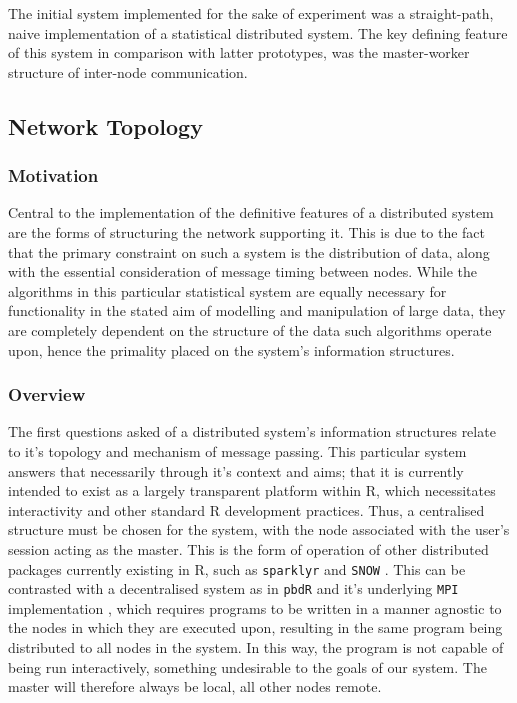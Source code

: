 The initial system implemented for the sake of experiment was a straight-path, naive implementation of a statistical distributed system.
The key defining feature of this system in comparison with latter prototypes, was the master-worker structure of inter-node communication.

\subsection{Network Topology}\label{sec:mw-topo}

\hypertarget{motivation}{%
\subsubsection{Motivation}\label{motivation}}

Central to the implementation of the definitive features of a
distributed system are the forms of structuring the network supporting it.
This is due to the fact that the primary constraint on such a system is
the distribution of data, along with the essential consideration of
message timing between nodes. While the algorithms in this particular
statistical system are equally necessary for functionality in the stated
aim of modelling and manipulation of large data, they are completely
dependent on the structure of the data such algorithms operate upon,
hence the primality placed on the system's information structures.

\hypertarget{overview}{%
\subsubsection{Overview}\label{overview}}

The first questions asked of a distributed system's information
structures relate to it's topology and mechanism of message passing.
This particular system answers that necessarily through it's context and
aims; that it is currently intended to exist as a largely transparent
platform within R, which necessitates interactivity and other standard R
development practices. Thus, a centralised structure must be chosen for
the system, with the node associated with the user's \R session acting as
the master. This is the form of operation of other distributed packages
currently existing in R, such as \texttt{sparklyr} and \texttt{SNOW}
\cite{luraschi20}\cite{tierney18}. This can be contrasted with a
decentralised system as in \texttt{pbdR} and it's underlying
\texttt{MPI} implementation \cite{pbdR2012}, which requires \R programs
to be written in a manner agnostic to the nodes in which they are
executed upon, resulting in the same program being distributed to all
nodes in the system. In this way, the program is not capable of being
run interactively, something undesirable to the goals of our system. The
master will therefore always be local, all other nodes remote.

